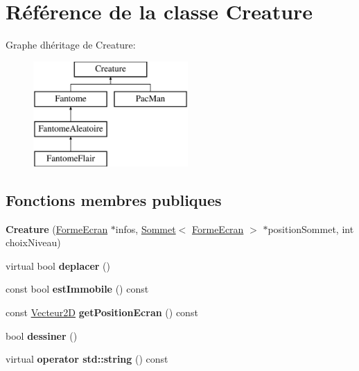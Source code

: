 \hypertarget{class_creature}{}\section{Référence de la classe Creature}
\label{class_creature}
Graphe d\textquotesingle{}héritage de Creature\+:\begin{figure}[H]
\begin{center}
\leavevmode
\includegraphics[height=4.000000cm]{class_creature}
\end{center}
\end{figure}
\subsection*{Fonctions membres publiques}
\begin{DoxyCompactItemize}
\item 
\mbox{\label{class_creature_a608a3974147b9d6f3c23404aa9b04fa1}} 
{\bfseries Creature} (\mbox{\hyperlink{class_forme_ecran}{Forme\+Ecran}} $\ast$infos, \mbox{\hyperlink{class_sommet}{Sommet}}$<$ \mbox{\hyperlink{class_forme_ecran}{Forme\+Ecran}} $>$ $\ast$position\+Sommet, int choix\+Niveau)
\item 
\mbox{\label{class_creature_a7c2d848ee2a3cb1f3c91b35a7eb504f6}} 
virtual bool {\bfseries deplacer} ()
\item 
\mbox{\label{class_creature_aafcbed99d0ee57caff3208c3bac7b400}} 
const bool {\bfseries est\+Immobile} () const
\item 
\mbox{\label{class_creature_a82d323d8dac99f5fd7f3cc1ec5d24348}} 
const \mbox{\hyperlink{class_vecteur2_d}{Vecteur2D}} {\bfseries get\+Position\+Ecran} () const
\item 
\mbox{\label{class_creature_a06f961954c7d9f99022e65e2835d4d52}} 
bool {\bfseries dessiner} ()
\item 
\mbox{\label{class_creature_a4c3007058a145a476d38478e949f9763}} 
virtual {\bfseries operator std\+::string} () const
\end{DoxyCompactItemize}

